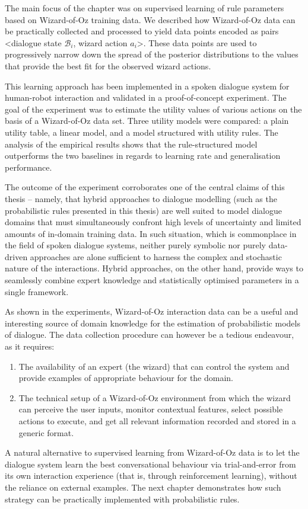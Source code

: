 The main focus of the chapter was on supervised learning of rule parameters based on Wizard-of-Oz training data. We described how Wizard-of-Oz data can be practically collected and processed to yield data points encoded as pairs <dialogue state $\mathcal{B}_i$, wizard action $a_i$>.  
These data points are used to progressively narrow down the spread of the posterior distributions to the values that provide the best fit for the observed wizard actions. 

This learning approach has been implemented in a spoken dialogue system for human-robot interaction and validated in a proof-of-concept experiment.  The goal of the experiment was to estimate the utility values of various actions on the basis of a Wizard-of-Oz data set.  Three utility models were compared: a plain utility table, a linear model, and a model structured with utility rules. The analysis of the empirical results shows that the rule-structured model outperforms the two baselines in regards to learning rate and generalisation performance. 

The outcome of the experiment corroborates one of the central claims of this thesis -- namely, that hybrid approaches to dialogue modelling (such as the probabilistic rules presented in this thesis) are well suited to model dialogue domains that must simultaneously confront high levels of uncertainty and limited amounts of in-domain training data.  In such situation, which is commonplace in the field of spoken dialogue systems, neither purely symbolic nor purely data-driven approaches are alone sufficient to harness the complex and stochastic nature of the interactions.  Hybrid approaches, on the other hand, provide ways to seamlessly combine expert knowledge and statistically optimised parameters in a single framework. 

As shown in the experiments, Wizard-of-Oz interaction data can be a useful and interesting source of domain knowledge for the estimation of probabilistic models of dialogue. The data collection procedure can however be a tedious endeavour, as it requires:
\begin{enumerate}
\item The availability of an expert (the wizard) that can control the system and provide examples of appropriate behaviour for the domain.
\item The technical setup of a Wizard-of-Oz environment from which the wizard can perceive the user inputs, monitor contextual features, select possible actions to execute, and get all relevant information recorded and stored in a generic format. 
\end{enumerate}

A natural alternative to supervised learning from Wizard-of-Oz data is to let the dialogue system learn the best conversational behaviour via trial-and-error from its own interaction experience (that is, through reinforcement learning), without the reliance on external examples.  The next chapter demonstrates how such strategy can be practically implemented with probabilistic rules. 
